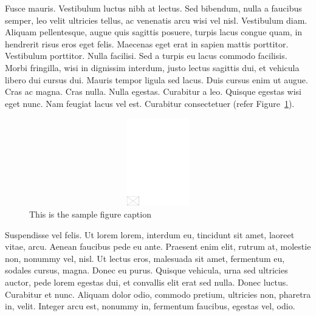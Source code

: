 \documentclass[CJCE,STIX2COL]{WileyNJD-v2}
\begin{document}
Fusce mauris. Vestibulum luctus nibh at lectus. Sed bibendum, nulla a faucibus semper, leo velit ultricies tellus, ac
venenatis arcu wisi vel nisl. Vestibulum diam. Aliquam pellentesque, augue quis sagittis posuere, turpis lacus congue
quam, in hendrerit risus eros eget felis. Maecenas eget erat in sapien mattis porttitor. Vestibulum porttitor. Nulla facilisi. Sed a turpis eu lacus commodo facilisis. Morbi fringilla, wisi in dignissim interdum, justo lectus sagittis dui, et
vehicula libero dui cursus dui. Mauris tempor ligula sed lacus. Duis cursus enim ut augue. Cras ac magna. Cras nulla.
Nulla egestas. Curabitur a leo. Quisque egestas wisi eget nunc. Nam feugiat lacus vel est. Curabitur consectetuer (refer Figure~\ref{fig1}).

\begin{figure}[t]
\centerline{\includegraphics[width=342pt,height=9pc,draft]{empty}}
\caption{This is the sample figure caption\label{fig1}}
\end{figure}

Suspendisse vel felis. Ut lorem lorem, interdum eu, tincidunt sit amet, laoreet vitae, arcu. Aenean faucibus pede eu
ante. Praesent enim elit, rutrum at, molestie non, nonummy vel, nisl. Ut lectus eros, malesuada sit amet, fermentum
eu, sodales cursus, magna. Donec eu purus. Quisque vehicula, urna sed ultricies auctor, pede lorem egestas dui, et
convallis elit erat sed nulla. Donec luctus. Curabitur et nunc. Aliquam dolor odio, commodo pretium, ultricies non,
pharetra in, velit. Integer arcu est, nonummy in, fermentum faucibus, egestas vel, odio.
\end{document}
